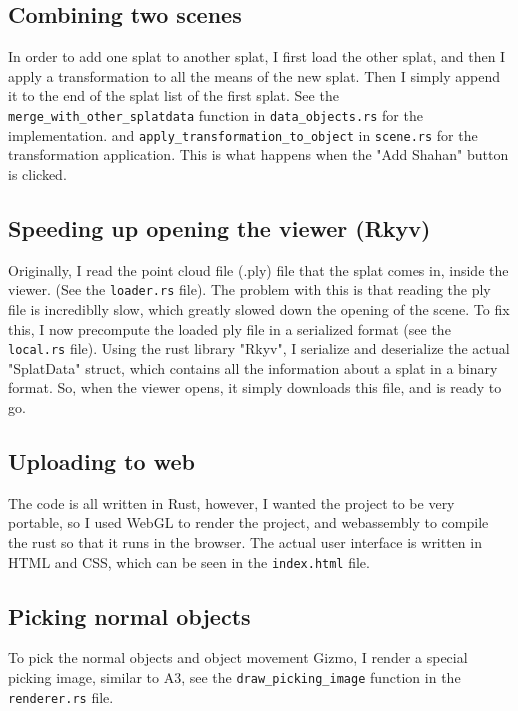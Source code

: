 \documentclass {article}
\begin{document}
\subsection{Combining two scenes}
In order to add one splat to another splat, I first load the other splat, and then I apply a transformation to all the means of the new splat. Then I simply append it to the end of the splat list of the first splat. See the \lstinline[style=inlinecode]{merge_with_other_splatdata} function in \lstinline[style=inlinecode]{data_objects.rs} for the implementation. and \lstinline[style=inlinecode]{apply_transformation_to_object} in \lstinline[style=inlinecode]{scene.rs} for the transformation application. This is what happens when the "Add Shahan" button is clicked.

\subsection{Speeding up opening the viewer (Rkyv)}
Originally, I read the point cloud file (.ply) file that the splat comes in, inside the viewer. (See the \lstinline[style=inlinecode]{loader.rs} file). The problem with this is that reading the ply file is incrediblly slow, which greatly slowed down the opening of the scene. To fix this, I now precompute the loaded ply file in a serialized format (see the \lstinline[style=inlinecode]{local.rs} file). Using the rust library "Rkyv", I serialize and deserialize the actual "SplatData" struct, which contains all the information about a splat in a binary format. So, when the viewer opens, it simply downloads this file, and is ready to go.


\subsection{Uploading to web}
The code is all written in Rust, however, I wanted the project to be very portable, so I used WebGL to render the project, and webassembly to compile the rust so that it runs in the browser. The actual user interface is written in HTML and CSS, which can be seen in the \lstinline[style=inlinecode]{index.html} file.

\subsection{Picking normal objects}
To pick the normal objects and object movement Gizmo, I render a special picking image, similar to A3, see the \lstinline[style=inlinecode]{draw_picking_image} function in the \lstinline[style=inlinecode]{renderer.rs} file.
\end{document}
